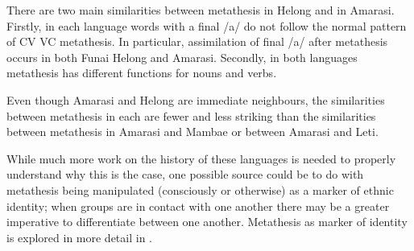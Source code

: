 There are two main similarities between metathesis in Helong and in Amarasi.
Firstly, in each language words with a final /a/ do not follow the normal
pattern of CV {\ra} VC metathesis.
In particular, assimilation of final /a/ after metathesis
occurs in both Funai Helong and Amarasi.
Secondly, in both languages metathesis has
different functions for nouns and verbs.

Even though Amarasi and Helong are immediate neighbours,
the similarities between metathesis in each
are fewer and less striking than the similarities between metathesis
in Amarasi and Mambae or between Amarasi and Leti.

While much more work on the history of these languages
is needed to properly understand why this is the case,
one possible source could be to do with metathesis being
manipulated (consciously or otherwise) as a marker of ethnic identity;
when groups are in contact with one another there may be a greater
imperative to differentiate between one another.
Metathesis as marker of identity is explored in more detail in .